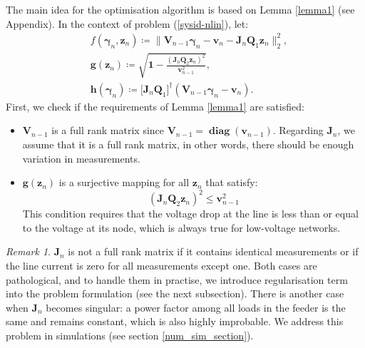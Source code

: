 \documentclass[journal,10pt,onecolumn,draftclsnofoot,]{IEEEtran}
\theoremstyle{plain}
\theoremstyle{definition}
\theoremstyle{remark}
\newtheorem*{remark}{Remark}
\DeclareMathOperator{\diag}{\mathbf{diag}}
\begin{document}
The main idea for the optimisation algorithm is based on Lemma \ref{lemma1} (see Appendix). In the context of problem (\ref{sysid-nlin}), let:
\begin{equation*}
\begin{split}
{}& f(\bm{\gamma}_{n}, \bm{z}_n) \coloneqq \Big\| \bm{V}_{n-1}\bm{\gamma}_{n} - \bm{v}_{n} - \bm{J}_{n}\bm{Q}_1\bm{z}_{n} \Big\|_2^2, \\
& \bm{g}(\bm{z}_{n}) \coloneqq \sqrt{\bm{1} - \frac{(\bm{J}_{n}\bm{Q}_2\bm{z}_{n})^2}{\bm{v}^2_{n-1}}}, \\
& \bm{h}(\bm{\gamma}_{n}) \coloneqq \big[ \bm{J}_{n}\bm{Q}_1 \big]^{\dagger} (\bm{V}_{n-1}\bm{\gamma}_{n} - \bm{v}_{n}).
\end{split}
\end{equation*}
First, we check if the requirements of Lemma \ref{lemma1} are satisfied:
\begin{itemize}
\item $\bm{V}_{n-1}$ is a full rank matrix since $\bm{V}_{n-1} = \diag{(\bm{v}_{n-1})}$. Regarding $\bm{J}_{n}$, we assume that it is a full rank matrix, in other words, there should be enough variation in measurements.
\item $\bm{g}(\bm{z}_{n})$ is a surjective mapping for all $\bm{z}_{n}$ that satisfy:
$$(\bm{J}_{n}\bm{Q}_2\bm{z}_{n})^2 \le \bm{v}^2_{n-1}$$
This condition requires that the voltage drop at the line is less than or equal to the voltage at its node, which is always true for low-voltage networks.
\end{itemize}
\begin{remark}
  $\bm{J}_n$ is not a full rank matrix if it contains identical measurements or if the line current is zero for all measurements except one. Both cases are pathological, and to handle them in practise, we introduce regularisation term into the problem formulation (see the next subsection). There is another case when $\bm{J}_n$ becomes singular: a power factor among all loads in the feeder is the same and remains constant, which is also highly improbable. We address this problem in simulations (see section \ref{num_sim_section}). 
  \label{remark_nonzero_J}
\end{remark}
\end{document}
